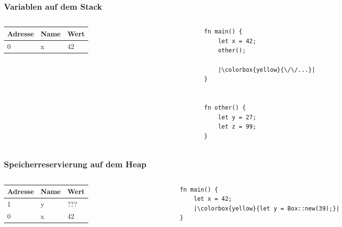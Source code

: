 \documentclass{beamer}
\begin{document}
\begin{frame}[fragile]
	\frametitle{Variablen auf dem Stack}
	\begin{columns}[T, c]
		\begin{column}{0.48\textwidth}
			\begin{tabular}{| l | l | l |}
				\hline
				Adresse & Name & Wert \\ \hline
				0 & x & 42 \\ \hline
			\end{tabular}
		\end{column}
		\begin{column}{0.48\textwidth}
			\begin{verbatim}
fn main() {
	let x = 42;
	other();

	|\colorbox{yellow}{\/\/...}|
}


fn other() {
	let y = 27;
	let z = 99;
}
			\end{verbatim}
		\end{column}
	\end{columns}
\end{frame}
\begin{frame}[fragile]
	\frametitle{Speicherreservierung auf dem Heap}
	\begin{columns}[T, c]
		\begin{column}{0.48\textwidth}
			\begin{tabular}{| l | l | l |}
				\hline
				Adresse & Name & Wert \\ \hline
				1 & y & ??? \\ \hline
				0 & x & 42 \\ \hline
			\end{tabular}
		\end{column}
		\begin{column}{0.48\textwidth}
			\begin{verbatim}
fn main() {
	let x = 42;
	|\colorbox{yellow}{let y = Box::new(39);}|
}
			\end{verbatim}
		\end{column}
	\end{columns}
\end{frame}
\end{document}
